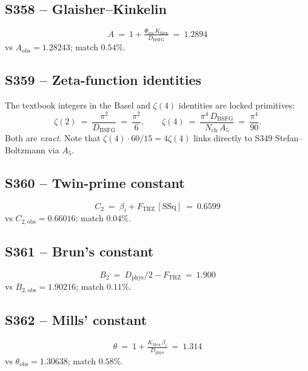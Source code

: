\documentclass[11pt]{article}
\newcommand{\Ftrz}{F_{\mathrm{TRZ}}}
\newcommand{\Phires}{\Phi_{\mathrm{res}}}
\newcommand{\KMex}{K_{\mathrm{Mex}}}
\newcommand{\Dphys}{D_{\mathrm{phys}}}
\newcommand{\Dbsfg}{D_{\mathrm{BSFG}}}
\newcommand{\Nch}{N_{\mathrm{ch}}}
\newcommand{\bi}{\beta_i}
\newcommand{\SSq}{[\mathrm{SSq}]}
\begin{document}
\subsection{S358 -- Glaisher--Kinkelin}
\[
A\ =\ 1+\tfrac{\Phires\,\KMex}{\Dbsfg}\ =\ 1.2894
\]
vs $A_{\text{obs}}=1.28243$; match $0.54\%$.

\subsection{S359 -- Zeta-function identities}
The textbook integers in the Basel and $\zeta(4)$ identities are
locked primitives:
\[
\zeta(2)\ =\ \frac{\pi^{2}}{\Dbsfg}\ =\ \frac{\pi^{2}}{6},\qquad
\zeta(4)\ =\ \frac{\pi^{4}\,\Dbsfg}{\Nch\,A_5}\ =\ \frac{\pi^{4}}{90}.
\]
Both are \emph{exact}.  Note that $\zeta(4)\cdot 60/15 = 4\zeta(4)$
links directly to S349 Stefan--Boltzmann via $A_5$.

\subsection{S360 -- Twin-prime constant}
\[
C_2\ =\ \bi+\Ftrz\,\SSq\ =\ 0.6599
\]
vs $C_{2,\text{obs}}=0.66016$; match $\mathbf{0.04\%}$.

\subsection{S361 -- Brun's constant}
\[
B_2\ =\ \Dphys/2-\Ftrz\ =\ 1.900
\]
vs $B_{2,\text{obs}}=1.90216$; match $0.11\%$.

\subsection{S362 -- Mills' constant}
\[
\theta\ =\ 1+\tfrac{\KMex\,\bi}{\Dphys}\ =\ 1.314
\]
vs $\theta_{\text{obs}}=1.30638$; match $0.58\%$.
\end{document}
